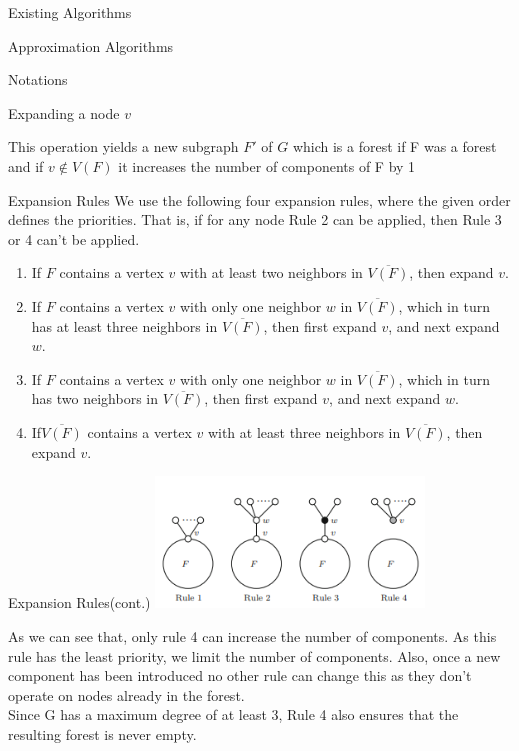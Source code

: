 \documentclass[xcolor=svgnames]{beamer}
\begin{document}
\begin{section}{Existing Algorithms}
\begin{subsection}{Approximation Algorithms}
\begin{frame}{Notations}
\begin{block}{Expanding a node $v$}
\begin{itemize}
                \end{itemize}
                This operation yields a new subgraph $F'$ of $G$ which is a forest if F was a forest and if $v \notin V(F)$ it increases the number of components of F by 1
            \end{block}
        \end{frame}
        \begin{frame}{Expansion Rules}
            We use the following four expansion rules, where the given order defines the priorities. That is, if for any node Rule 2 can be applied, then Rule 3 or 4 can't be applied.
            \begin{enumerate}
                \item If $F$ contains a vertex $v$ with at least two neighbors in $\overline{V(F)}$, then expand $v$.
                \item  If $F$ contains a vertex $v$ with only one neighbor $w$ in $\overline{V(F)}$, which in turn has at least three neighbors in $\overline{V(F)}$, then first expand $v$, and next expand $w$.
                \item If $F$ contains a vertex $v$ with only one neighbor $w$ in $\overline{V(F)}$, which in turn has two neighbors in $\overline{V(F)}$, then first expand $v$, and next expand $w$.
                \item If$\overline{V(F)}$ contains a vertex $v$ with at least three neighbors in $\overline{V(F)}$, then expand $v$.
            \end{enumerate}
        \end{frame}
        \begin{frame}{Expansion Rules(cont.)}
            \centering
            \includegraphics[height=3.5cm]{solis.png}
            \\
            \raggedright
            As we can see that, only rule 4 can increase the number of components. As this rule has the least priority, we limit the number of components. Also, once a new component has been introduced no other rule can change this as they don't operate on nodes already in the forest.\\
            Since G has a maximum degree of at least 3, Rule 4 also ensures that the resulting forest is never empty. 

\end{frame}
\end{subsection}
\end{section}
\end{document}
